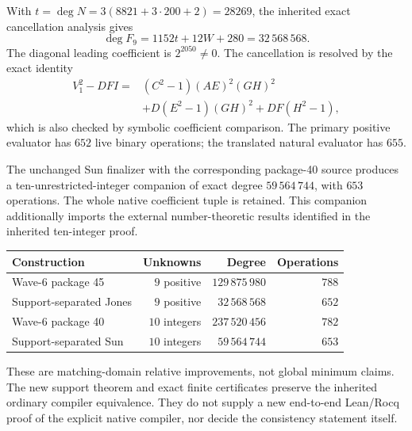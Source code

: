 With $t=\deg N=3(8821+3\cdot200+2)=28269$, the inherited exact
cancellation analysis gives
\[
 \deg F_9=1152t+12W+280=32\,568\,568.
\]
The diagonal leading coefficient is $2^{2050}\ne0$. The cancellation
is resolved by the exact identity
\[
\begin{split}
 V_1^2-DFI={}&(C^2-1)(AE)^2(GH)^2\\
 &+D(E^2-1)(GH)^2+DF(H^2-1),
\end{split}
\]
which is also checked by symbolic coefficient comparison.
The primary positive evaluator has $652$ live binary operations;
the translated natural evaluator has $655$.

The unchanged Sun finalizer with the corresponding package-40 source
produces a ten-unrestricted-integer companion of exact degree
$59\,564\,744$, with $653$ operations. The whole native coefficient
tuple is retained. This companion additionally imports the external
number-theoretic results identified in the inherited ten-integer proof.

\begin{center}
\begin{tabular}{lrrr}
\hline
Construction & Unknowns & Degree & Operations\\
\hline
Wave-6 package 45 & $9$ positive & $129\,875\,980$ & $788$\\
Support-separated Jones & $9$ positive & $32\,568\,568$ & $652$\\
Wave-6 package 40 & $10$ integers & $237\,520\,456$ & $782$\\
Support-separated Sun & $10$ integers & $59\,564\,744$ & $653$\\
\hline
\end{tabular}
\end{center}

These are matching-domain relative improvements, not global minimum
claims. The new support theorem and exact finite certificates preserve
the inherited ordinary compiler equivalence. They do not supply a new
end-to-end Lean/Rocq proof of the explicit native compiler, nor decide
the consistency statement itself.
